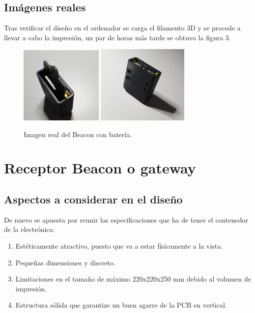 \documentclass[paper=a4, fontsize=11pt,twoside]{scrartcl}
\begin{document}
    \subsection{Imágenes reales}
        Tras verificar el diseño en el ordenador se carga el filamento 3D y se procede a llevar a cabo la impresión, un par de horas más tarde
        se obtuvo la figura 3.
        \begin{center}
            \begin{figure}[ht]
                \centering
                \includegraphics[width=0.36\textwidth]{../3d_beacon_1.jpeg}
                \includegraphics[width=0.4\textwidth]{../3d_beacon_2.jpeg}
                \caption{Imagen real del Beacon con batería.}
                \label{fig:mesh1}
            \end{figure}
        \end{center}

\section{Receptor Beacon o gateway}
    \subsection{Aspectos a considerar en el diseño}
        De nuevo se apuesta por reunir las especificaciones que ha de tener el contenedor de la electrónica:
        \begin{enumerate}
            \item Estéticamente atractivo, puesto que va a estar físicamente a la vista.
            \item Pequeñas dimensiones y discreto.
            \item Limitaciones en el tamaño de máximo 220x220x250 mm debido al volumen de impresión.
            \item Estructura sólida que garantize un buen agarre de la PCB en vertical.
        \end{enumerate}
\end{document}
